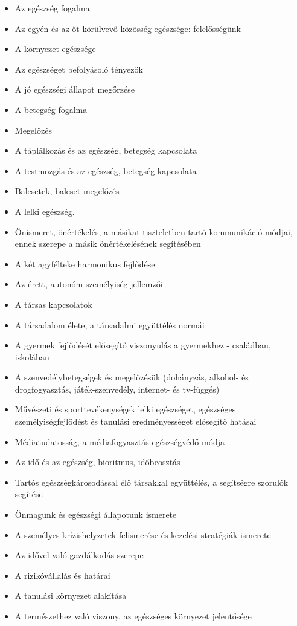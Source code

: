 \begin{itemize}

\item
  Az egészség fogalma
\item
  Az egyén és az őt körülvevő közösség egészsége: felelősségünk
\item
  A környezet egészsége
\item
  Az egészséget befolyásoló tényezők
\item
  A jó egészségi állapot megőrzése
\item
  A betegség fogalma
\item
  Megelőzés
\item
  A táplálkozás és az egészség, betegség kapcsolata
\item
  A testmozgás és az egészség, betegség kapcsolata
\item
  Balesetek, baleset-megelőzés
\item
  A lelki egészség.
\item
  Önismeret, önértékelés, a másikat tiszteletben tartó kommunikáció
  módjai, ennek szerepe a másik önértékelésének segítésében
\item
  A két agyfélteke harmonikus fejlődése
\item
  Az érett, autonóm személyiség jellemzői
\item
  A társas kapcsolatok
\item
  A társadalom élete, a társadalmi együttélés normái
\item
  A gyermek fejlődését elősegítő viszonyulás a gyermekhez - családban,
  iskolában
\item
  A szenvedélybetegségek és megelőzésük (dohányzás, alkohol- és
  drogfogyasztás, játék-szenvedély, internet- és tv-függés)
\item
  Művészeti és sporttevékenységek lelki egészséget, egészséges
  személyiségfejlődést és tanulási eredményességet elősegítő hatásai
\item
  Médiatudatosság, a médiafogyasztás egészségvédő módja
\item
  Az idő és az egészség, bioritmus, időbeosztás
\item
  Tartós egészségkárosodással élő társakkal együttélés, a segítségre
  szorulók segítése
\item
  Önmagunk és egészségi állapotunk ismerete
\item
  A személyes krízishelyzetek felismerése és kezelési stratégiák
  ismerete
\item
  Az idővel való gazdálkodás szerepe
\item
  A rizikóvállalás és határai
\item
  A tanulási környezet alakítása
\item
  A természethez való viszony, az egészséges környezet jelentősége
\end{itemize}

